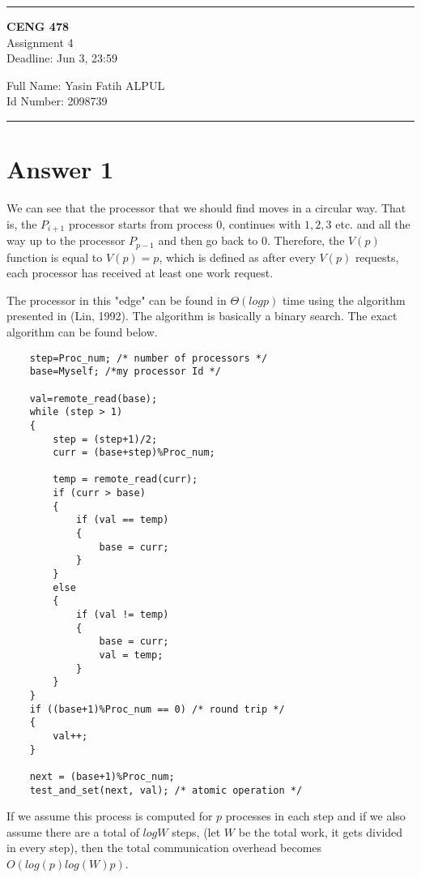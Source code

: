 \documentclass[11pt]{article}
\newcommand{\HRule}{\rule{\linewidth}{1mm}}
\begin{document}
\noindent
\HRule
\begin{center}
\Large 
\textbf{CENG 478}  \\
\normalsize 
Assignment 4 \\
Deadline: Jun 3, 23:59 \\
\end{center}
\begin{flushleft}
\normalsize 
	Full Name: Yasin Fatih ALPUL\\
	Id Number: 2098739
\end{flushleft}
\HRule

\section*{Answer 1}
We can see that the processor that we should find moves in a circular way.
    That is, the $P_{i+1}$ processor starts from process $0$, continues with $1,2,3$ etc. and all the way up to the processor $P_{p-1}$ and then go back to $0$.
    Therefore, the $V(p)$ function is equal to $V(p)=p$, which is defined as after
    every $V(p)$ requests, each processor has received at least one work request.
    
The processor in this "edge" can be found in $\Theta(logp)$ time using the algorithm
    presented in (Lin, 1992). The algorithm is basically a binary search. The
    exact algorithm can be found below.
    
\begin{verbatim}
    step=Proc_num; /* number of processors */
    base=Myself; /*my processor Id */
    
    val=remote_read(base);
    while (step > 1)
    {
        step = (step+1)/2;
        curr = (base+step)%Proc_num;
        
        temp = remote_read(curr);
        if (curr > base)
        {
            if (val == temp)
            {
                base = curr;
            }
        }
        else
        {
            if (val != temp)
            {
                base = curr;
                val = temp;
            }
        }
    }
    if ((base+1)%Proc_num == 0) /* round trip */
    {
        val++;
    }
    
    next = (base+1)%Proc_num;
    test_and_set(next, val); /* atomic operation */
\end{verbatim}
If we assume this process is computed for $p$ processes in each step and if we
    also assume there are a total of $logW$ steps, (let $W$ be the total work, it
    gets divided in every step), then the total communication overhead becomes
    $O(log(p)log(W)p)$.
\end{document}
